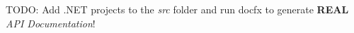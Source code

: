 TODO\+: Add .NET projects to the {\itshape src} folder and run {\ttfamily docfx} to generate {\bfseries{REAL}} {\itshape API Documentation}! 